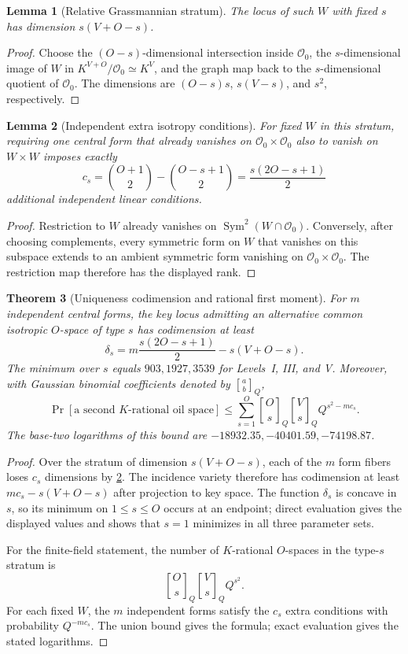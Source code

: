 \documentclass[10pt,a4paper]{article}
\newtheorem{theorem}{Theorem}[section]
\newtheorem{lemma}[theorem]{Lemma}
\newcommand{\cO}{\mathcal O}
\newcommand{\Sym}{\operatorname{Sym}}
\begin{document}
\begin{lemma}[Relative Grassmannian stratum]\label{lem:relative-grassmann}
The locus of such $W$ with fixed $s$ has dimension $s(V+O-s)$.
\end{lemma}

\begin{proof}
Choose the $(O-s)$-dimensional intersection inside $\cO_0$, the $s$-dimensional image of $W$ in $K^{V+O}/\cO_0\simeq K^V$, and the graph map back to the $s$-dimensional quotient of $\cO_0$.  The dimensions are $(O-s)s$, $s(V-s)$, and $s^2$, respectively.
\end{proof}

\begin{lemma}[Independent extra isotropy conditions]\label{lem:extra-isotropy}
For fixed $W$ in this stratum, requiring one central form that already vanishes on $\cO_0\times\cO_0$ also to vanish on $W\times W$ imposes exactly
\[
c_s=\binom{O+1}{2}-\binom{O-s+1}{2}=\frac{s(2O-s+1)}2
\]
additional independent linear conditions.
\end{lemma}

\begin{proof}
Restriction to $W$ already vanishes on $\Sym^2(W\cap\cO_0)$.  Conversely, after choosing complements, every symmetric form on $W$ that vanishes on this subspace extends to an ambient symmetric form vanishing on $\cO_0\times\cO_0$.  The restriction map therefore has the displayed rank.
\end{proof}

\begin{theorem}[Uniqueness codimension and rational first moment]\label{thm:uniqueness}
For $m$ independent central forms, the key locus admitting an alternative common isotropic $O$-space of type $s$ has codimension at least
\[
\delta_s=m\frac{s(2O-s+1)}2-s(V+O-s).
\]
The minimum over $s$ equals $903,1927,3539$ for Levels~I, III, and V.  Moreover, with Gaussian binomial coefficients denoted by $\genfrac{[}{]}{0pt}{}{a}{b}_Q$,
\[
\Pr[\text{a second $K$-rational oil space}]
\le
\sum_{s=1}^{O}
\genfrac{[}{]}{0pt}{}{O}{s}_Q
\genfrac{[}{]}{0pt}{}{V}{s}_Q
Q^{s^2-mc_s}.
\]
The base-two logarithms of this bound are $-18932.35,-40401.59,-74198.87$.
\end{theorem}

\begin{proof}
Over the stratum of dimension $s(V+O-s)$, each of the $m$ form fibers loses $c_s$ dimensions by \cref{lem:extra-isotropy}.  The incidence variety therefore has codimension at least $mc_s-s(V+O-s)$ after projection to key space.  The function $\delta_s$ is concave in $s$, so its minimum on $1\le s\le O$ occurs at an endpoint; direct evaluation gives the displayed values and shows that $s=1$ minimizes in all three parameter sets.

For the finite-field statement, the number of $K$-rational $O$-spaces in the type-$s$ stratum is
\[
\genfrac{[}{]}{0pt}{}{O}{s}_Q
\genfrac{[}{]}{0pt}{}{V}{s}_Q Q^{s^2}.
\]
For each fixed $W$, the $m$ independent forms satisfy the $c_s$ extra conditions with probability $Q^{-mc_s}$.  The union bound gives the formula; exact evaluation gives the stated logarithms.
\end{proof}
\end{document}
